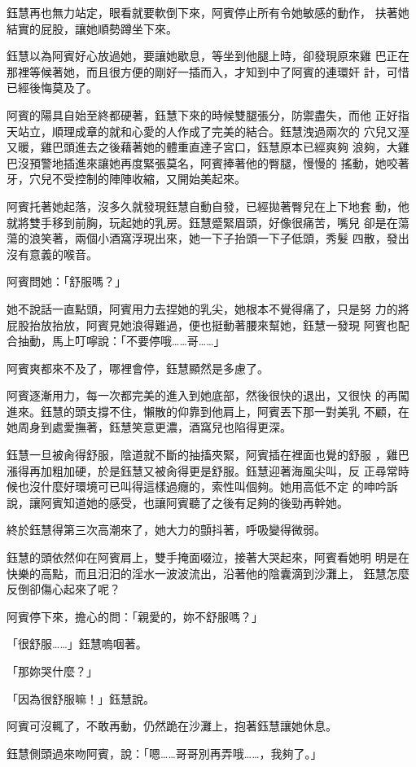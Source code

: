 鈺慧再也無力站定，眼看就要軟倒下來，阿賓停止所有令她敏感的動作，
扶著她結實的屁股，讓她順勢蹲坐下來。

鈺慧以為阿賓好心放過她，要讓她歇息，等坐到他腿上時，卻發現原來雞
巴正在那裡等候著她，而且很方便的剛好一插而入，才知到中了阿賓的連環奸
計，可惜已經後悔莫及了。

阿賓的陽具自始至終都硬著，鈺慧下來的時候雙腿張分，防禦盡失，而他
正好指天站立，順理成章的就和心愛的人作成了完美的結合。鈺慧洩過兩次的
穴兒又溼又暖，雞巴頭進去之後藉著她的體重直達子宮口，鈺慧原本已經爽夠
浪夠，大雞巴沒預警地插進來讓她再度緊張莫名，阿賓捧著他的臀腿，慢慢的
搖動，她咬著牙，穴兒不受控制的陣陣收縮，又開始美起來。

阿賓托著她起落，沒多久就發現鈺慧自動自發，已經拋著臀兒在上下地套
動，他就將雙手移到前胸，玩起她的乳房。鈺慧蹙緊眉頭，好像很痛苦，嘴兒
卻是在蕩蕩的浪笑著，兩個小酒窩浮現出來，她一下子抬頭一下子低頭，秀髮
四散，發出沒有意義的喉音。

阿賓問她：「舒服嗎？」

她不說話一直點頭，阿賓用力去捏她的乳尖，她根本不覺得痛了，只是努
力的將屁股抬放抬放，阿賓見她浪得難過，便也挺動著腰來幫她，鈺慧一發現
阿賓也配合抽動，馬上叮嚀說：「不要停哦……哥……」

阿賓爽都來不及了，哪裡會停，鈺慧顯然是多慮了。

阿賓逐漸用力，每一次都完美的進入到她底部，然後很快的退出，又很快
的再闖進來。鈺慧的頭支撐不住，懶散的仰靠到他肩上，阿賓丟下那一對美乳
不顧，在她周身到處愛撫著，鈺慧笑意更濃，酒窩兒也陷得更深。

鈺慧一旦被肏得舒服，陰道就不斷的抽搐夾緊，阿賓插在裡面也覺的舒服
，雞巴漲得再加粗加硬，於是鈺慧又被肏得更是舒服。鈺慧迎著海風尖叫，反
正尋常時候也沒什麼好環境可已叫得這樣過癮的，索性叫個夠。她用高低不定
的呻吟訴說，讓阿賓知道她的感受，也讓阿賓聽了之後有足夠的後勁再幹她。

終於鈺慧得第三次高潮來了，她大力的顫抖著，呼吸變得微弱。

鈺慧的頭依然仰在阿賓肩上，雙手掩面啜泣，接著大哭起來，阿賓看她明
明是在快樂的高點，而且汨汨的淫水一波波流出，沿著他的陰囊滴到沙灘上，
鈺慧怎麼反倒卻傷心起來了呢？

阿賓停下來，擔心的問：「親愛的，妳不舒服嗎？」

「很舒服……」鈺慧嗚咽著。

「那妳哭什麼？」

「因為很舒服嘛！」鈺慧說。

阿賓可沒輒了，不敢再動，仍然跪在沙灘上，抱著鈺慧讓她休息。

鈺慧側頭過來吻阿賓，說：「嗯……哥哥別再弄哦……，我夠了。」

